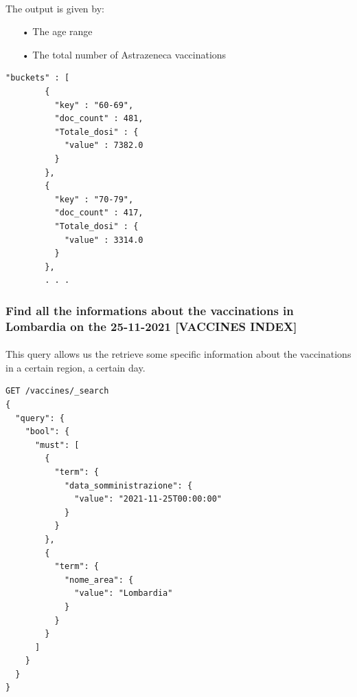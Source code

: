 \documentclass[a4paper,12pt]{article}
\begin{document}
\paragraph{} The output is given by: 
\begin{itemize}
\item[•] The age range
\item[•] The total number of Astrazeneca vaccinations
\end{itemize}
\begin{tcolorbox}[colback=red!5!white,colframe=red!75!black,title=OUTPUT]
\begin{verbatim}
"buckets" : [
        {
          "key" : "60-69",
          "doc_count" : 481,
          "Totale_dosi" : {
            "value" : 7382.0
          }
        },
        {
          "key" : "70-79",
          "doc_count" : 417,
          "Totale_dosi" : {
            "value" : 3314.0
          }
        },
        . . .
\end{verbatim}
\end{tcolorbox}
\newpage

\subsubsection{Find all the informations about the vaccinations in Lombardia on the 25-11-2021 [VACCINES INDEX]}
\paragraph{} This query allows us the retrieve some specific information about the vaccinations in a certain region, a certain day.
\begin{tcolorbox}[colback=green!5!white,colframe=green!75!black,title=QUERY]
\begin{verbatim}
GET /vaccines/_search
{
  "query": {
    "bool": {
      "must": [
        {
          "term": {
            "data_somministrazione": {
              "value": "2021-11-25T00:00:00"
            }
          }
        },
        {
          "term": {
            "nome_area": {
              "value": "Lombardia"
            }
          }
        }
      ]
    }
  }
}
\end{verbatim}
\end{tcolorbox}
\newpage
\end{document}
